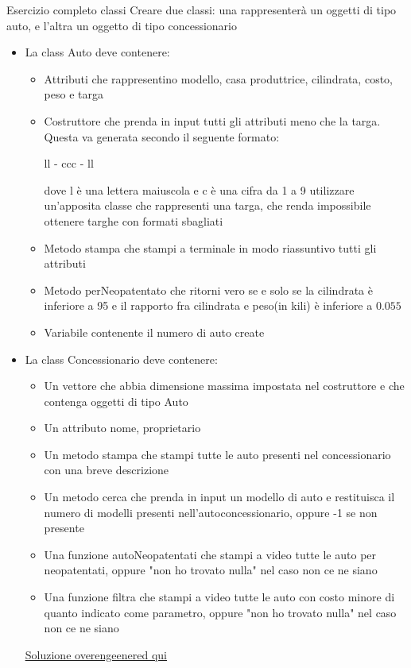 \begin{esercizioL}{Esercizio completo classi}
	Creare due classi: una rappresenterà un oggetti di tipo auto, e l'altra un oggetto di tipo concessionario
	\begin{itemize}
		\item La {\ttfamily class Auto} deve contenere:
		      \begin{itemize}
			      \item Attributi che rappresentino modello, casa produttrice, cilindrata, costo,  peso e targa
			      \item Costruttore che prenda in input tutti gli attributi meno che la targa. Questa va generata secondo il seguente formato:
			            \begin{center}
				            {\ttfamily ll - ccc - ll}
			            \end{center}
			            dove {\ttfamily l} è una lettera maiuscola e {\ttfamily c} è una cifra da 1 a 9
			            utilizzare un'apposita classe che rappresenti una targa, che renda impossibile ottenere targhe con formati sbagliati
			      \item Metodo {\ttfamily stampa} che stampi a terminale in modo riassuntivo tutti gli attributi
			      \item Metodo {\ttfamily perNeopatentato} che ritorni vero se e solo se la cilindrata è inferiore a 95 e il rapporto fra cilindrata e peso(in kili) è inferiore a $ 0.055 $
			      \item Variabile contenente il numero di auto create
		      \end{itemize}
		\item La {\ttfamily class Concessionario} deve contenere:
		      \begin{itemize}
			      \item Un vettore che abbia dimensione massima impostata nel costruttore e che contenga oggetti di tipo Auto
			      \item Un attributo nome, proprietario
			      \item Un metodo {\ttfamily stampa} che stampi tutte le auto presenti nel concessionario con una breve descrizione
			      \item Un metodo {\ttfamily cerca} che prenda in input un modello di auto e restituisca il numero di modelli presenti nell'autoconcessionario, oppure -1 se non presente
			      \item Una funzione {\ttfamily autoNeopatentati} che stampi a video tutte le auto per neopatentati, oppure "non ho trovato nulla" nel caso non ce ne siano
			      \item Una funzione {\ttfamily filtra} che stampi a video tutte le auto con costo minore di quanto indicato come parametro, oppure "non ho trovato nulla" nel caso non ce ne siano
		      \end{itemize}
		      \href{file:///Users/mattia/Library/Mobile Documents/com~apple~CloudDocs/Workspaces/latex_workspace/Ripetizioni/files/Esercizi/Classi/Automobile/.}{\underline{Soluzione overengeenered qui}}
	\end{itemize}

\end{esercizioL}




